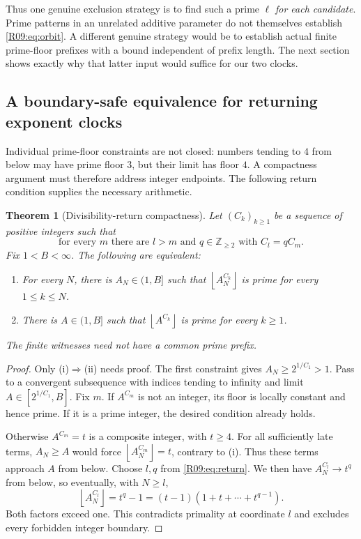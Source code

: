\documentclass[11pt,a4paper]{article}
\newtheorem{theorem}{Theorem}[section]
\theoremstyle{definition}\newtheorem{definition}[theorem]{Definition}
\theoremstyle{remark}\newtheorem{remark}[theorem]{Remark}
\newcommand{\floor}[1]{\left\lfloor#1\right\rfloor}
\begin{document}
Thus one genuine exclusion strategy is to find such a prime $\ell$
\emph{for each candidate}. Prime patterns in an unrelated additive
parameter do not themselves establish \eqref{R09:eq:orbit}. A different
genuine strategy would be to establish actual finite prime-floor
prefixes with a bound independent of prefix length. The next section
shows exactly why that latter input would suffice for our two clocks.

\subsection{A boundary-safe equivalence for returning exponent clocks}

Individual prime-floor constraints are not closed: numbers tending
to $4$ from below may have prime floor $3$, but their limit has floor
$4$. A compactness argument must therefore address integer endpoints.
The following return condition supplies the necessary arithmetic.

\begin{theorem}[Divisibility-return compactness]\label{R09:thm:compact}
Let $(C_k)_{k\ge1}$ be a sequence of positive integers such that
\begin{equation}\label{R09:eq:return}
 \text{for every }m\text{ there are }l>m\text{ and }q\in\mathbb Z_{\ge2}
 \text{ with }C_l=qC_m.
\end{equation}
Fix $1<B<\infty$. The following are equivalent:
\begin{enumerate}[label=(\roman*)]
\item For every $N$, there is $A_N\in(1,B]$ such that
$\floor{A_N^{C_k}}$ is prime for every $1\le k\le N$.
\item There is $A\in(1,B]$ such that $\floor{A^{C_k}}$ is prime for
 every $k\ge1$.
\end{enumerate}
The finite witnesses need not have a common prime prefix.
\end{theorem}
\begin{proof}
Only (i)$\Rightarrow$(ii) needs proof. The first constraint gives
$A_N\ge2^{1/C_1}>1$. Pass to a convergent subsequence with indices
tending to infinity and limit $A\in[2^{1/C_1},B]$. Fix $m$.
If $A^{C_m}$ is not an integer, its floor is locally constant and
hence prime. If it is a prime integer, the desired condition already
holds.

Otherwise $A^{C_m}=t$ is a composite integer, with $t\ge4$.
For all sufficiently late terms, $A_N\ge A$ would force
$\floor{A_N^{C_m}}=t$, contrary to (i). Thus these terms approach $A$
from below. Choose $l,q$ from \eqref{R09:eq:return}. We then have
$A_N^{C_l}\to t^q$ from below, so eventually, with $N\ge l$,
\[
 \floor{A_N^{C_l}}=t^q-1
 =(t-1)(1+t+\cdots+t^{q-1}).
\]
Both factors exceed one. This contradicts primality at coordinate
$l$ and excludes every forbidden integer boundary.
\end{proof}
\end{document}
